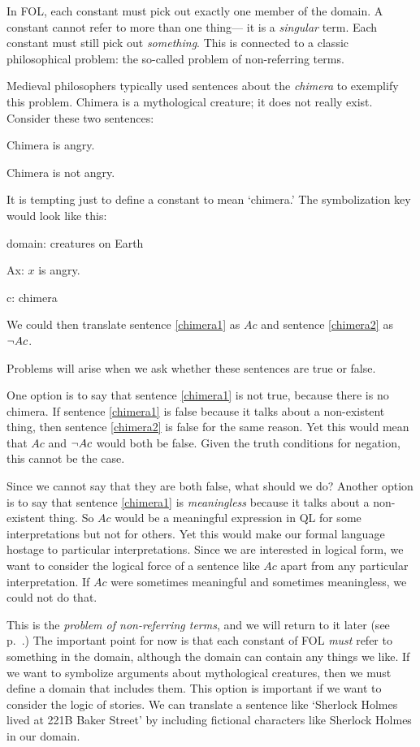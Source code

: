 In FOL, each constant must pick out exactly one member of the domain. A constant cannot refer to more than one thing--- it is a \emph{singular} term. Each constant must still pick out \emph{something}. This is connected to a classic philosophical problem: the so-called problem of non-referring terms.

Medieval philosophers typically used sentences about the \emph{chimera} to exemplify this problem. Chimera is a mythological creature; it does not really exist. Consider these two sentences:
\begin{earg}
\item[\ex{chimera1}] Chimera is angry.
\item[\ex{chimera2}] Chimera is not angry.
\end{earg}
It is tempting just to define a constant to mean `chimera.' The symbolization key would look like this:
\begin{ekey}
\item[domain:] creatures on Earth
\item[Ax:] $x$ is angry.
\item[c:] chimera
\end{ekey}
We could then translate sentence \ref{chimera1} as $Ac$ and sentence \ref{chimera2} as $\neg Ac$.

Problems will arise when we ask whether these sentences are true or false.

One option is to say that sentence \ref{chimera1} is not true, because there is no chimera. If sentence \ref{chimera1} is false because it talks about a non-existent thing, then sentence \ref{chimera2} is false for the same reason. Yet this would mean that $Ac$ and $\neg Ac$ would both be false. Given the truth conditions for negation, this cannot be the case.

Since we cannot say that they are both false, what should we do? Another option is to say that sentence \ref{chimera1} is \emph{meaningless} because it talks about a non-existent thing. So $Ac$ would be a meaningful expression in QL for some interpretations but not for others. Yet this would make our formal language hostage to particular interpretations. Since we are interested in logical form, we want to consider the logical force of a sentence like $Ac$ apart from any particular interpretation. If $Ac$ were sometimes meaningful and sometimes meaningless, we could not do that.

This is the \emph{problem of non-referring terms}, and we will return to it later (see p.~\pageref{subsec.defdesc}.) The important point for now is that each constant of FOL \emph{must} refer to something in the domain, although the domain can contain any things we like. If we want to symbolize arguments about mythological creatures, then we must define a domain that includes them. This option is important if we want to consider the logic of stories. We can translate a sentence like `Sherlock Holmes lived at 221B Baker Street' by including fictional characters like Sherlock Holmes in our domain.

